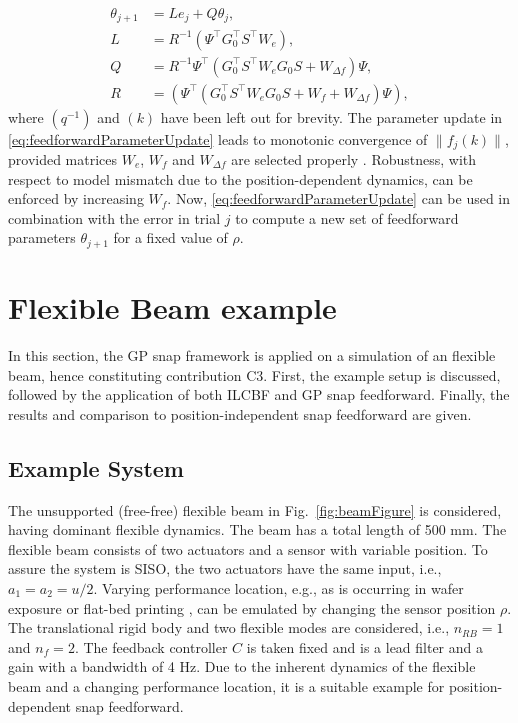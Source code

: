 \documentclass[letterpaper, 10 pt, conference]{ieeeconf}  %
\newcounter{example}
\begin{document}
\begin{equation}
	\label{eq:feedforwardParameterUpdate}
	\begin{split}
		{\theta}_{j+1} &= Le_j+Q{\theta}_j, \\
		L&=R^{-1}\left(\Psi^{\top}G_0^{\top} S^{\top} W_{e}\right), \\
		Q&=R^{-1} \Psi^{\top}\left(G_0^{\top} S^{\top} W_{e} G_0 S+W_{\Delta f}\right) \Psi, \\
		R &= \left(\Psi^{\top}\left(G_0^{\top} S^{\top} W_{e} G_0 S+W_{f}+W_{\Delta f}\right) \Psi\right),
	\end{split}
\end{equation}
where $(q^{-1})$ and $(k)$ have been left out for brevity. The parameter update in \eqref{eq:feedforwardParameterUpdate} leads to monotonic convergence of $\|f_j(k)\|$, provided matrices $W_e$, $W_f$ and $W_{\Delta f}$ are selected properly \cite{Bolder2014}. Robustness, with respect to model mismatch due to the position-dependent dynamics, can be enforced by increasing $W_f$. Now, \eqref{eq:feedforwardParameterUpdate} can be used in combination with the error in trial $j$ to compute a new set of feedforward parameters $\theta_{j+1}$ for a fixed value of $\rho$. 
\section{Flexible Beam example}
\label{sec:results}
In this section, the GP snap framework is applied on a simulation of an flexible beam, hence constituting contribution C3. First, the example setup is discussed, followed by the application of both ILCBF and GP snap feedforward. Finally, the results and comparison to position-independent snap feedforward are given.
\subsection{Example System}
The unsupported (free-free) flexible beam in Fig.~\ref{fig:beamFigure} is considered, having dominant flexible dynamics. The beam has a total length of 500 mm. The flexible beam consists of two actuators and a sensor with variable position. To assure the system is SISO, the two actuators have the same input, i.e., $a_1=a_2=u/2$. Varying performance location, e.g., as is occurring in wafer exposure \cite{Voorhoeve2021} or flat-bed printing \cite{deRozario2017}, can be emulated by changing the sensor position $\rho$. The translational rigid body and two flexible modes are considered, i.e., $n_{RB}=1$ and $n_f=2$. The feedback controller $C$ is taken fixed and is a lead filter and a gain with a bandwidth of 4 Hz. Due to the inherent dynamics of the flexible beam and a changing performance location, it is a suitable example for position-dependent snap feedforward.
\end{document}
